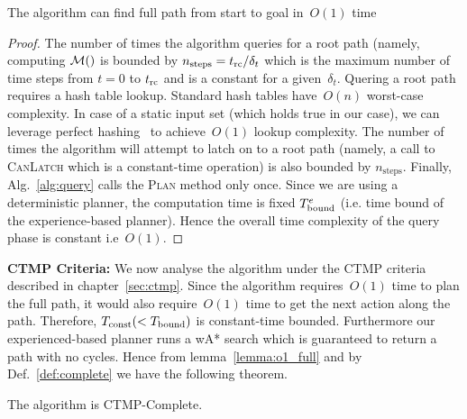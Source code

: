 \documentclass[a4paper]{report}
\begin{document}
\begin{lemma}
\label{lemma:o1_full}
	The algorithm can find full path from start to goal in~$O(1)$ time
\end{lemma}
\begin{proof}
	The number of times the algorithm queries for a root path (namely, computing $\mathcal{M}()$ is bounded by $n_{\textrm{steps}} = t_{\textrm{rc}}/\delta_t$ which is the maximum number of time steps from $t = 0$ to $t_{\textrm{rc}}$ and is a constant for a given~$\delta_t$.
Quering a root path requires a hash table lookup. Standard hash tables have~$O(n)$ worst-case complexity. In case of a static input set (which holds true in our case), we can leverage perfect hashing~\cite{czech1997perfect} to achieve~$O(1)$ lookup complexity.
    The number of times the algorithm will attempt to latch on to a root path (namely, a call to \textsc{CanLatch}  which is a constant-time operation) is also bounded by $n_{\textrm{steps}}$. Finally, Alg.~\ref{alg:query} calls the \textsc{Plan} method only once.
    Since we are using a deterministic planner, the computation time is fixed $T_{\textrm{bound}}^e$ (i.e. time bound of the experience-based planner).
    Hence the overall time complexity of the query phase is constant i.e~$O(1)$.
\end{proof}

\textbf{CTMP Criteria:} We now analyse the algorithm under the CTMP criteria described in chapter~\ref{sec:ctmp}. Since the algorithm requires~$O(1)$ time to plan the full path, it would also require~$O(1)$ time to get the next action along the path. Therefore, $T_\textrm{const} (< T_{\textrm{bound}})$ is constant-time bounded. Furthermore our experienced-based planner runs a wA* search which is guaranteed to return a path with no cycles. Hence from lemma~\ref{lemma:o1_full} and by Def.~\ref{def:complete} we have the following theorem.

\vspace{2mm}
\begin{theorem}
	The algorithm is CTMP-Complete.
\end{theorem}

%
\end{document}
